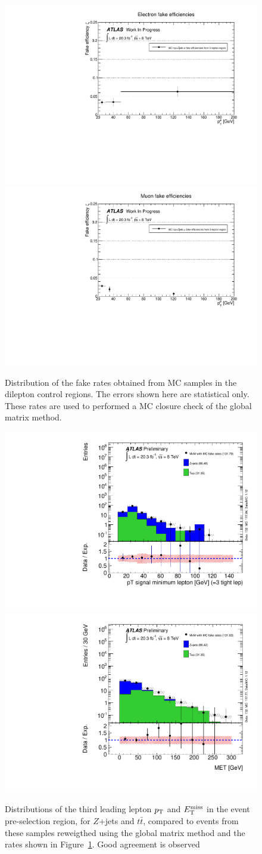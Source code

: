 \begin{figure}[ht!]
\centering
\includegraphics[width=0.42\columnwidth]{figures/ClosureCheck_MatrixMethod/ElFakeRates_MC_topZjets_new.pdf}
\includegraphics[width=0.42\columnwidth]{figures/ClosureCheck_MatrixMethod/MuFakeRates_MC_topZjets_new.pdf}
\caption{Distribution of the fake rates obtained from MC samples in the dilepton control regions. The errors shown here are statistical only. These rates are used to performed a MC closure check of the global matrix method.}
\label{fig:MCFakeRatesClosure}
\end{figure}

\begin{figure}[ht!]
\centering
\includegraphics[width=0.42\columnwidth]{figures/ClosureCheck_MatrixMethod/PtThirdLepSignal_TTT_total_new.pdf}
\includegraphics[width=0.42\columnwidth]{figures/ClosureCheck_MatrixMethod/VR_PMET_lepTTT_total_new.pdf}
\caption{Distributions of the third leading lepton $p_{\mathrm{T}}$ and $E_{\mathrm{T}}^{\mathrm{miss}}$ in the event pre-selection region, for $Z$+jets and $t\bar{t}$, compared to events from these samples reweigthed using the global matrix method and the rates shown in Figure~\ref{fig:MCFakeRatesClosure}. Good agreement is observed}
\label{fig:MCClosureCheckMatrixMethod}
\end{figure}





